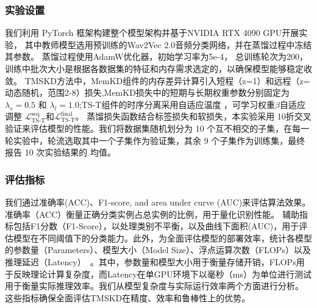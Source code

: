 \documentclass[a4paper, 12pt]{article}
\begin{document}
\subsubsection{实验设置}
我们利用 PyTorch 框架构建整个模型架构并基于NVIDIA RTX 4090 GPU开展实验，
其中教师模型选用预训练的Wav2Vec 2.0音频分类网络，并在蒸馏过程中冻结其参数。
蒸馏过程使用AdamW优化器，初始学习率为5e-4，
总训练轮次为200，训练中批次大小是根据各数据集的特征和内存需求选定的，以确保模型能够稳定收敛。
TMSKD方法中，MemKD组件的内存差异计算引入短程（z=1）和远程（z=动态随机，范围2-8）损失,MemKD损失中的短期与长期权重参数分别固定为 $\lambda_s= 0.5  $ 和 $\lambda_l= 1.0  $;TS-T组件的时序分离采用自适应温度
，可学习权重$\beta$自适应调整 $\mathcal{L}_{\mathrm{TS\mbox{-}T}}^{\mathrm{seq}}$和$\mathcal{L}_{\mathrm{TS\mbox{-}T}}^{\mathrm{final}}$。
蒸馏损失函数结合标签损失和软损失，本实验采用 10折交叉验证来评估模型的性能。我们将数据集随机划分为 10 个互不相交的子集，在每一轮实验中，轮流选取其中一个子集作为验证集，其余 9 个子集作为训练集，最终报告 10 次实验结果的 均值。
\subsubsection{评估指标}
我们通过准确率(ACC)、F1-score, and area under curve (AUC)来评估算法效果。准确率（ACC）衡量正确分类实例占总实例的比例，用于量化识别性能。
辅助指标包括F1分数（F1-Score），以处理类别不平衡，以及曲线下面积(AUC)，用于评估模型在不同阈值下的分类能力。此外，为全面评估模型的部署效率，统计各模型的参数量（Parameters）、模型大小（Model Size）、浮点运算次数（FLOPs）以及推理延迟（Latency）~\cite{Han2016DeepCompression}。其中，参数量和模型大小用于衡量存储开销，FLOPs用于反映理论计算复杂度，而Latency在单GPU环境下以毫秒（ms）为单位进行测试用于衡量实际推理效率。我们从模型复杂度与实际运行效率两个方面进行分析。
这些指标确保全面评估TMSKD在精度、效率和鲁棒性上的优势。
\end{document}
